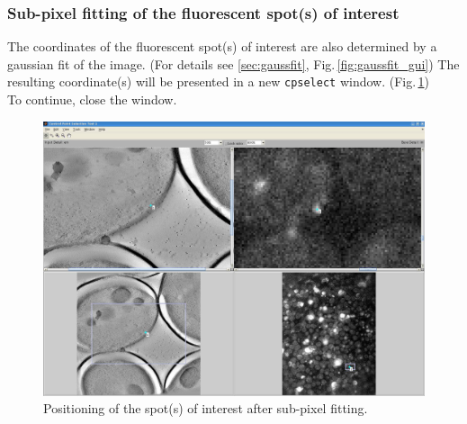 \documentclass[10pt,a4paper,onepage,DIV12]{scrartcl}
\begin{document}
\subsubsection{Sub-pixel fitting of the fluorescent spot(s) of interest}
The coordinates of the fluorescent spot(s) of interest are also determined by a gaussian fit of the image. (For details see \ref{sec:gaussfit}, Fig.\,\ref{fig:gaussfit_gui}) The resulting coordinate(s) will be presented in a new \texttt{cpselect} window. (Fig.\,\ref{fig:cpsel_fluor2})\\

To continue, close the window. 
\newpage
% 

\begin{figure}
 \centering
 \includegraphics[width=.78\textwidth]{images/cpsel_fluor2.jpg}
 \caption{Positioning of the spot(s) of interest after sub-pixel fitting.}
 \label{fig:cpsel_fluor2}
\end{figure}
\end{document}
